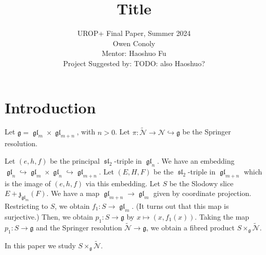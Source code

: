 \documentclass[12pt,psamsfonts]{article}
\author{
UROP+ Final Paper, Summer 2024\\
Owen Conoly\\
Mentor: Haoshuo Fu\\
Project Suggested by: TODO: also Haoshuo?
}
\date{}
\title{Title}
\DeclareMathOperator{\gl}{\mathfrak{gl}}
\DeclareMathOperator{\spl}{\mathfrak{sl}}
\begin{document}
\maketitle
\begin{abstract}
    
\end{abstract}

\section{Introduction}
Let \(\mathfrak{g} = \gl_m \times \gl_{m + n}\), with \(n > 0\).
Let \(\pi : \widetilde{\mathcal{N}} \to \mathcal{N} \hookrightarrow \mathfrak{g}\) be the Springer resolution.
\par Let \((e, h, f)\) be the principal \(\spl_2\)-triple in \(\gl_n\).
We have an embedding \(\gl_n \hookrightarrow \gl_m \times \gl_n \hookrightarrow \gl_{m + n}\).
Let \((E, H, F)\) be the \(\spl_2\)-triple in \(\gl_{m + n}\) which is the image of \((e, h, f)\) via this embedding.
Let \(S\) be the Slodowy slice \(E + \mathfrak{z}_{\gl_m}(F)\).
We have a map \(\gl_{m + n} \to \gl_m\) given by coordinate projection.
Restricting to \(S\), we obtain \(f_1 : S \to \gl_m\).
(It turns out that this map is surjective.)
Then, we obtain \(p_1 : S \to \mathfrak{g}\) by \(x \mapsto (x, f_1(x))\).
Taking the map \(p_1 : S \to \mathfrak{g}\) and the Springer resolution \(\widetilde{\mathcal{N}} \to \mathfrak{g}\), we obtain a fibred product \(S \times_\mathfrak{g} \widetilde{\mathcal{N}}\).
\par In this paper we study \(S \times_\mathfrak{g} \widetilde{\mathcal{N}}\).
\end{document}
